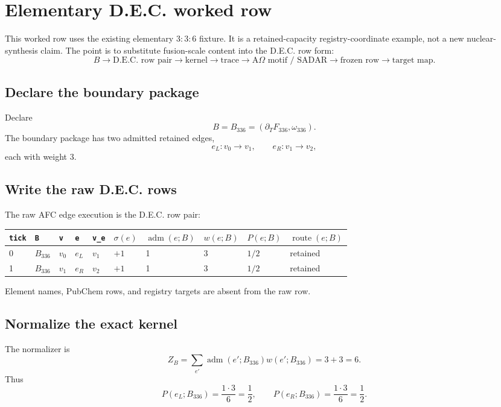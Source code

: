 \section{Elementary D.E.C. worked row}

This worked row uses the existing elementary $3{:}3{:}6$ fixture. It is a retained-capacity registry-coordinate example, not a new nuclear-synthesis claim. The point is to substitute fusion-scale content into the D.E.C. row form:
\[
B\to\text{D.E.C. row pair}\to\text{kernel}\to\text{trace}\to\text{A\(\Omega\) motif / SADAR}\to\text{frozen row}\to\text{target map}.
\]

\subsection{Declare the boundary package}

Declare
\[
B=B_{336}=(\partial_TF_{336},\omega_{336}).
\]
The boundary package has two admitted retained edges,
\[
e_L:v_0\to v_1,
\qquad
 e_R:v_1\to v_2,
\]
each with weight $3$.

\subsection{Write the raw D.E.C. rows}

The raw AFC edge execution is the D.E.C. row pair:
\begin{center}
\scriptsize
\begin{tabularx}{0.99\linewidth}{@{}llllllllll@{}}
\toprule
\texttt{tick} & \texttt{B} & \texttt{v} & \texttt{e} & \texttt{v\_e} & $\sigma(e)$ & $\operatorname{adm}(e;B)$ & $w(e;B)$ & $P(e;B)$ & $\operatorname{route}(e;B)$ \\
\midrule
0 & $B_{336}$ & $v_0$ & $e_L$ & $v_1$ & $+1$ & 1 & 3 & $1/2$ & retained \\
1 & $B_{336}$ & $v_1$ & $e_R$ & $v_2$ & $+1$ & 1 & 3 & $1/2$ & retained \\
\bottomrule
\end{tabularx}
\end{center}
Element names, PubChem rows, and registry targets are absent from the raw row.

\subsection{Normalize the exact kernel}

The normalizer is
\[
Z_B=\sum_{e'}\operatorname{adm}(e';B_{336})w(e';B_{336})=3+3=6.
\]
Thus
\[
P(e_L;B_{336})=\frac{1\cdot3}{6}=\frac12,
\qquad
P(e_R;B_{336})=\frac{1\cdot3}{6}=\frac12.
\]

